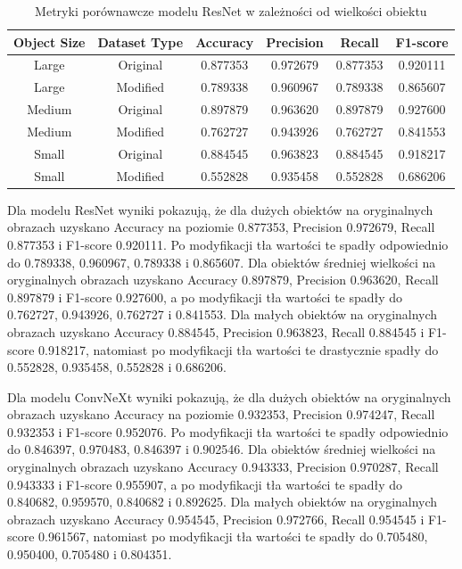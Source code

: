 \begin{table}
	\centering
	\begin{tabular}{|c|c|c|c|c|c|}
		\hline
		\textbf{Object Size} & \textbf{Dataset Type} & \textbf{Accuracy} & \textbf{Precision} & \textbf{Recall} & \textbf{F1-score} \\
		\hline
		Large & Original & 0.877353 & 0.972679 & 0.877353 & 0.920111 \\
		\hline
		Large & Modified & 0.789338 & 0.960967 & 0.789338 & 0.865607 \\
		\hline
		Medium & Original & 0.897879 & 0.963620 & 0.897879 & 0.927600 \\
		\hline
		Medium & Modified & 0.762727 & 0.943926 & 0.762727 & 0.841553 \\
		\hline
		Small & Original & 0.884545 & 0.963823 & 0.884545 & 0.918217 \\
		\hline
		Small & Modified & 0.552828 & 0.935458 & 0.552828 & 0.686206 \\
		\hline
	\end{tabular}
	\caption{Metryki porównawcze modelu ResNet w zależności od wielkości obiektu}
	\label{tab:resnet_object_size_metrics}
\end{table}

Dla modelu ResNet wyniki pokazują, że dla dużych obiektów na oryginalnych obrazach uzyskano Accuracy na poziomie 0.877353, Precision 0.972679, Recall 0.877353 i F1-score 0.920111. Po modyfikacji tła wartości te spadły odpowiednio do 
0.789338, 0.960967, 0.789338 i 0.865607. Dla obiektów średniej wielkości na oryginalnych obrazach uzyskano Accuracy 0.897879, Precision 0.963620, Recall 0.897879 i F1-score 0.927600, a po modyfikacji tła wartości te spadły do 0.762727, 
0.943926, 0.762727 i 0.841553. Dla małych obiektów na oryginalnych obrazach uzyskano Accuracy 0.884545, Precision 0.963823, Recall 0.884545 i F1-score 0.918217, natomiast po modyfikacji tła wartości te drastycznie spadły do 0.552828, 0.935458, 
0.552828 i 0.686206.

Dla modelu ConvNeXt wyniki pokazują, że dla dużych obiektów na oryginalnych obrazach uzyskano Accuracy na poziomie 0.932353, Precision 0.974247, Recall 0.932353 i F1-score 0.952076. Po modyfikacji tła wartości te spadły odpowiednio do 
0.846397, 0.970483, 0.846397 i 0.902546. Dla obiektów średniej wielkości na oryginalnych obrazach uzyskano Accuracy 0.943333, Precision 0.970287, Recall 0.943333 i F1-score 0.955907, a po modyfikacji tła wartości te spadły do 0.840682, 
0.959570, 0.840682 i 0.892625. Dla małych obiektów na oryginalnych obrazach uzyskano Accuracy 0.954545, Precision 0.972766, Recall 0.954545 i F1-score 0.961567, natomiast po modyfikacji tła wartości te spadły do 0.705480, 0.950400, 0.705480 i 
0.804351.

